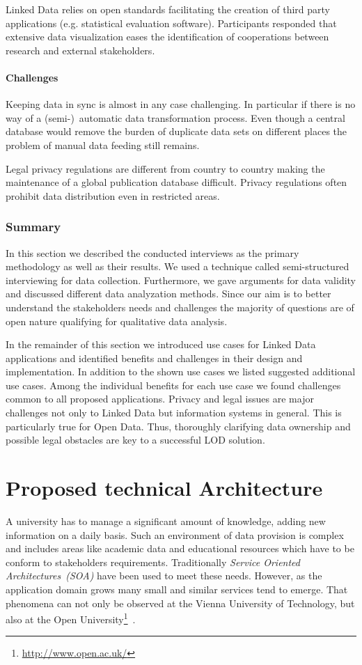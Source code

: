 \documentclass{article}
\begin{document}
Linked Data relies on open standards facilitating the creation of third party applications (e.g. statistical evaluation software). Participants responded that extensive data visualization eases the identification of cooperations between research and external stakeholders. 
\paragraph{Challenges}
Keeping data in sync is almost in any case challenging. In particular if there is no way of a (semi-)~automatic data transformation process. Even though a central database would remove the burden of duplicate data sets on different places the problem of manual data feeding still remains. 

Legal privacy regulations are different from country to country making the maintenance of a global publication database difficult. Privacy regulations often prohibit data distribution even in restricted areas. 
\subsubsection{Summary}
In this section we described the conducted interviews as the primary methodology as well as their results. We used a technique called semi-structured interviewing for data collection. Furthermore, we gave arguments for data validity and discussed different data analyzation methods. Since our aim is to better understand the stakeholders needs and challenges the majority of questions are of open nature qualifying for qualitative data analysis. 

In the remainder of this section we introduced use cases for Linked Data applications and identified benefits and challenges in their design and implementation. In addition to the shown use cases we listed suggested additional use cases. Among the individual benefits for each use case we found challenges common to all proposed applications. Privacy and legal issues are major challenges not only to Linked Data but information systems in general. This is particularly true for Open Data. Thus, thoroughly clarifying data ownership and possible legal obstacles are key to a successful LOD solution.  

\section{Proposed technical Architecture}
A university has to manage a significant amount of knowledge, adding new information on a daily basis.
Such an environment of data provision is complex and includes areas like academic data and educational resources which have to be conform to stakeholders requirements. Traditionally \textit{Service Oriented Architectures~(SOA)} have been used to meet these needs. However, as the application domain grows many small and similar services tend to emerge. That phenomena can not only be observed at the Vienna University of Technology, but also at the Open University\footnote{\url{http://www.open.ac.uk/}}~\cite{inproceedings:zablith_consuming_2011}.
\end{document}
